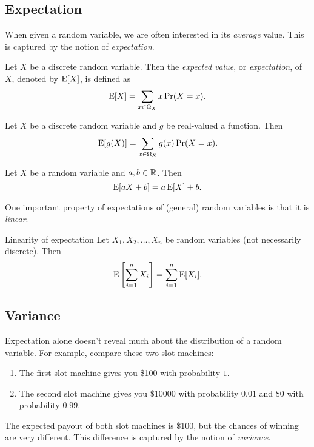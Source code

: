 \documentclass{article}
\begin{document}
\subsection{Expectation}

When given a random variable, we are often interested in its \emph{average} value.
This is captured by the notion of \emph{expectation}.

\begin{definition}
  Let $X$ be a discrete random variable.
  Then the \emph{expected value}, or \emph{expectation}, of $X$, denoted by $\operatorname{E}[X]$, is defined as
  \[
    \operatorname{E}[X] = \sum_{x \in \Omega_X} x \Pr(X = x).
  \]
\end{definition}

\begin{proposition}
  Let $X$ be a discrete random variable and $g$ be real-valued a function.
  Then
  \[
    \operatorname{E}[g(X)] = \sum_{x \in \Omega_X} g(x) \Pr(X = x).
  \]
\end{proposition}

\begin{corollary}
  Let $X$ be a random variable and $a, b \in \mathbb{R}$.
  Then
  \[
    \operatorname{E}[a X + b] = a \operatorname{E}[X] + b.
  \]
\end{corollary}

One important property of expectations of (general) random variables is that it is \emph{linear}.

\begin{theorem}{Linearity of expectation}
  Let $X_1, X_2, \ldots, X_n$ be random variables (not necessarily discrete).
  Then
  \[
    \operatorname{E}\left[\sum\limits_{i = 1}^n X_i\right] = \sum\limits_{i = 1}^n \operatorname{E}[X_i].
  \]
\end{theorem}

\subsection{Variance}

Expectation alone doesn't reveal much about the distribution of a random variable.
For example, compare these two slot machines:
\begin{enumerate}
  \item The first slot machine gives you \$100 with probability $1$.
  \item The second slot machine gives you \$10000 with probability $0.01$ and \$0 with probability $0.99$.
\end{enumerate}
The expected payout of both slot machines is \$100, but the chances of winning are very different.
This difference is captured by the notion of \emph{variance}.
\end{document}
